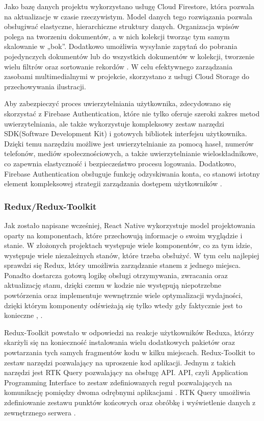 Jako bazę danych projektu wykorzystano usługę Cloud Firestore, która pozwala na aktualizacje w czasie rzeczywistym. Model danych tego rozwiązania pozwala obsługiwać elastyczne, hierarchiczne struktury danych. Organizacja wpisów polega na tworzeniu dokumentów, a w nich kolekcji tworząc tym samym skalowanie w „bok”. Dodatkowo umożliwia wysyłanie zapytań do pobrania pojedynczych dokumentów lub do wszystkich dokumentów w kolekcji, tworzenie wielu filtrów oraz sortowanie rekordów \cite{storage}. W celu efektywnego zarządzania zasobami multimedialnymi w projekcie, skorzystano z usługi Cloud Storage do przechowywania ilustracji.

Aby zabezpieczyć proces uwierzytelniania użytkownika, zdecydowano się skorzystać z Firebase Authentication, które nie tylko oferuje szeroki zakres metod uwierzytelniania, ale także wykorzystuje kompleksowy zestaw narzędzi SDK(Software Development Kit) i gotowych bibliotek interfejsu użytkownika. Dzięki temu narzędziu możliwe jest uwierzytelnianie za pomocą haseł, numerów telefonów, mediów społecznościowych, a także uwierzytelnianie wieloskładnikowe, co zapewnia elastyczność i bezpieczeństwo procesu logowania. Dodatkowo, Firebase Authentication obsługuje funkcję odzyskiwania konta, co stanowi istotny element kompleksowej strategii zarządzania dostępem użytkowników \cite{authenticationase}.


\subsubsection*{\textbf{Redux/Redux-Toolkit}}
Jak zostało napisane wcześniej, React Native wykorzystuje model projektowania oparty
na komponentach, które przechowują informacje o swoim wyglądzie i stanie. W złożonych
projektach występuje wiele komponentów, co za tym idzie, występuje wiele niezależnych
stanów, które trzeba obsłużyć. W tym celu najlepiej sprawdzi się Redux, który umożliwia
zarządzanie stanem z jednego miejsca. Ponadto dostarcza gotową logikę obsługi
otrzymywania, zwracania oraz aktualizację stanu, dzięki czemu w kodzie nie występują
niepotrzebne powtórzenia oraz implementuje wewnętrznie wiele optymalizacji wydajności,
dzięki którym komponenty odświeżają się tylko wtedy gdy faktycznie jest to konieczne \cite{learningredux}, \cite{reactredux}.

Redux-Toolkit powstało w odpowiedzi na reakcje użytkowników Reduxa, którzy skarżyli się na konieczność instalowania wielu dodatkowych pakietów oraz powtarzania tych samych fragmentów kodu w kilku miejscach. Redux-Toolkit to zestaw narzędzi pozwalający na uproszenie kod aplikacji. Jednym z takich narzędzi jest RTK Query pozwalający na obsługę API. API, czyli Application Programming Interface to zestaw zdefiniowanych reguł pozwalających na komunikację pomiędzy dwoma odrębnymi aplikacjami \cite{api}. RTK Query umożliwia zdefiniowanie zestawu punktów końcowych oraz obróbkę i wyświetlenie danych z zewnętrznego serwera \cite{reduxtoolkit}.

